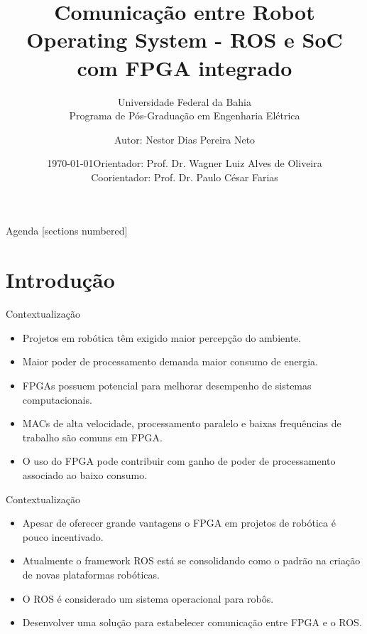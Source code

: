 \documentclass[10pt]{beamer}
\title{Comunicação entre Robot Operating System - ROS e SoC com FPGA integrado}
\subtitle{Universidade Federal da Bahia\\
            Programa de Pós-Graduação em Engenharia Elétrica}
\date{\today}
\date{Orientador: Prof. Dr. Wagner Luiz Alves de Oliveira\\Coorientador: Prof. Dr. Paulo César Farias}
\author{Autor: Nestor Dias Pereira Neto}
\institute{Salvador, 5 de dezembro de 2022}
\begin{document}
\maketitle

\begin{frame}{Agenda}
  [sections numbered]
  \tableofcontents[hideallsubsections]
\end{frame}


\section{Introdução}

\begin{frame}{Contextualização}
	\begin{alertblock}{}
    	\begin{itemize}
		\setlength\itemsep{0.7em}
    	\item Projetos em robótica têm exigido maior percepção do ambiente.
    	\item Maior poder de processamento demanda maior consumo de energia.
    	\item FPGAs possuem potencial para melhorar desempenho de sistemas computacionais.
    	\item MACs de alta velocidade, processamento paralelo e baixas frequências de trabalho são comuns em FPGA. 
    	\item O uso do FPGA pode contribuir com ganho de poder de processamento associado ao baixo consumo.
    	\end{itemize}
    \end{alertblock}
 \nocite{LwIP,freertosbook,ROSeffect,PDSfpga,NiosIIbook,ROSfpga}
\end{frame}

\begin{frame}{Contextualização}
	\begin{alertblock}{}
    	\begin{itemize}%
		\setlength\itemsep{1em}
		\item Apesar de oferecer grande vantagens o FPGA em projetos de robótica é pouco incentivado.
    	\item Atualmente o framework ROS está se consolidando como o padrão na criação de novas plataformas robóticas.
    	\item O ROS é considerado um sistema operacional para robôs.
    	\item Desenvolver uma solução para estabelecer comunicação entre FPGA e o ROS.
    	\end{itemize}
    \end{alertblock}
 \nocite{LwIP,freertosbook,ROSeffect,PDSfpga,NiosIIbook,ROSfpga}
\end{frame}
\end{document}
